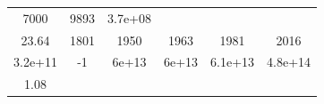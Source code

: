 \documentclass[]{book}
\theoremstyle{definition}
\theoremstyle{definition}
\theoremstyle{definition}
\theoremstyle{remark}
\begin{document}
\begin{longtable}[]{@{}cccccc@{}}
\begin{minipage}[t]{0.12\columnwidth}
7000\strut
\end{minipage} & \begin{minipage}[t]{0.12\columnwidth}\centering\strut
9893\strut
\end{minipage} & \begin{minipage}[t]{0.14\columnwidth}\centering\strut
3.7e+08\strut
\end{minipage}\tabularnewline
\begin{minipage}[t]{0.14\columnwidth}\centering\strut
23.64\strut
\end{minipage} & \begin{minipage}[t]{0.08\columnwidth}\centering\strut
1801\strut
\end{minipage} & \begin{minipage}[t]{0.12\columnwidth}\centering\strut
1950\strut
\end{minipage} & \begin{minipage}[t]{0.12\columnwidth}\centering\strut
1963\strut
\end{minipage} & \begin{minipage}[t]{0.12\columnwidth}\centering\strut
1981\strut
\end{minipage} & \begin{minipage}[t]{0.14\columnwidth}\centering\strut
2016\strut
\end{minipage}\tabularnewline
\begin{minipage}[t]{0.14\columnwidth}\centering\strut
3.2e+11\strut
\end{minipage} & \begin{minipage}[t]{0.08\columnwidth}\centering\strut
-1\strut
\end{minipage} & \begin{minipage}[t]{0.12\columnwidth}\centering\strut
6e+13\strut
\end{minipage} & \begin{minipage}[t]{0.12\columnwidth}\centering\strut
6e+13\strut
\end{minipage} & \begin{minipage}[t]{0.12\columnwidth}\centering\strut
6.1e+13\strut
\end{minipage} & \begin{minipage}[t]{0.14\columnwidth}\centering\strut
4.8e+14\strut
\end{minipage}\tabularnewline
\begin{minipage}[t]{0.14\columnwidth}\centering\strut
1.08\strut
\end{minipage} & \begin{minipage}[t]{0.08\columnwidth}\centering\strut

\end{minipage}
\end{longtable}
\end{document}
